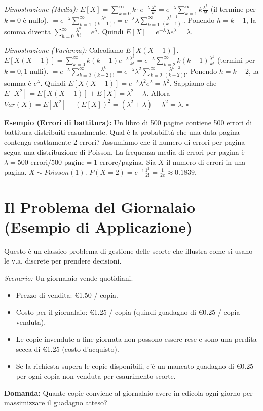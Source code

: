 \textit{Dimostrazione (Media):}
$E[X] = \sum_{k=0}^\infty k \cdot e^{-\lambda} \frac{\lambda^k}{k!} = e^{-\lambda} \sum_{k=1}^\infty k \frac{\lambda^k}{k!}$ (il termine per $k=0$ è nullo).
$= e^{-\lambda} \sum_{k=1}^\infty \frac{\lambda^k}{(k-1)!} = e^{-\lambda} \lambda \sum_{k=1}^\infty \frac{\lambda^{k-1}}{(k-1)!}$.
Ponendo $h=k-1$, la somma diventa $\sum_{h=0}^\infty \frac{\lambda^h}{h!} = e^\lambda$.
Quindi $E[X] = e^{-\lambda} \lambda e^\lambda = \lambda$.

\textit{Dimostrazione (Varianza):}
Calcoliamo $E[X(X-1)]$.
$E[X(X-1)] = \sum_{k=0}^\infty k(k-1) e^{-\lambda} \frac{\lambda^k}{k!} = e^{-\lambda} \sum_{k=2}^\infty k(k-1) \frac{\lambda^k}{k!}$ (termini per $k=0,1$ nulli).
$= e^{-\lambda} \sum_{k=2}^\infty \frac{\lambda^k}{(k-2)!} = e^{-\lambda} \lambda^2 \sum_{k=2}^\infty \frac{\lambda^{k-2}}{(k-2)!}$.
Ponendo $h=k-2$, la somma è $e^\lambda$.
Quindi $E[X(X-1)] = e^{-\lambda} \lambda^2 e^\lambda = \lambda^2$.
Sappiamo che $E[X^2] = E[X(X-1)] + E[X] = \lambda^2 + \lambda$.
Allora $Var(X) = E[X^2] - (E[X])^2 = (\lambda^2+\lambda) - \lambda^2 = \lambda$. $\square$

\begin{example}
\textbf{Esempio (Errori di battitura):}
Un libro di 500 pagine contiene 500 errori di battitura distribuiti casualmente. Qual è la probabilità che una data pagina contenga esattamente 2 errori?
Assumiamo che il numero di errori per pagina segua una distribuzione di Poisson.
La frequenza media di errori per pagina è $\lambda = 500 \text{ errori} / 500 \text{ pagine} = 1 \text{ errore/pagina}$.
Sia $X$ il numero di errori in una pagina. $X \sim Poisson(1)$.
$P(X=2) = e^{-1} \frac{1^2}{2!} = \frac{1}{2e} \approx 0.1839$.
\end{example}


\section{Il Problema del Giornalaio (Esempio di Applicazione)}
Questo è un classico problema di gestione delle scorte che illustra come si usano le v.a. discrete per prendere decisioni.

\textit{Scenario:}
Un giornalaio vende quotidiani.
\begin{itemize}
    \item Prezzo di vendita: €1.50 / copia.
    \item Costo per il giornalaio: €1.25 / copia (quindi guadagno di €0.25 / copia venduta).
    \item Le copie invendute a fine giornata non possono essere rese e sono una perdita secca di €1.25 (costo d'acquisto).
    \item Se la richiesta supera le copie disponibili, c'è un mancato guadagno di €0.25 per ogni copia non venduta per esaurimento scorte.
\end{itemize}
\textbf{Domanda:} Quante copie conviene al giornalaio avere in edicola ogni giorno per massimizzare il guadagno atteso?

